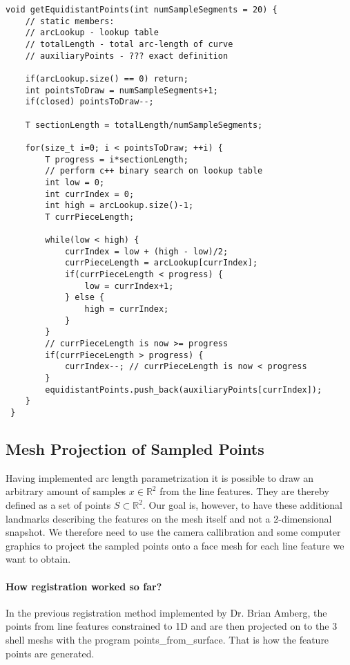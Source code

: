 \begin{lstlisting}[label=some-code, caption=Equidistant Sampling]
void getEquidistantPoints(int numSampleSegments = 20) {
    // static members: 
    // arcLookup - lookup table
    // totalLength - total arc-length of curve
    // auxiliaryPoints - ??? exact definition 

    if(arcLookup.size() == 0) return;
    int pointsToDraw = numSampleSegments+1; 
    if(closed) pointsToDraw--;

    T sectionLength = totalLength/numSampleSegments;

    for(size_t i=0; i < pointsToDraw; ++i) {
        T progress = i*sectionLength;
        // perform c++ binary search on lookup table
        int low = 0;
        int currIndex = 0;
        int high = arcLookup.size()-1;
        T currPieceLength; 

        while(low < high) {
            currIndex = low + (high - low)/2; 
            currPieceLength = arcLookup[currIndex];
            if(currPieceLength < progress) {
                low = currIndex+1;
            } else {
                high = currIndex;
            }
        }
        // currPieceLength is now >= progress
        if(currPieceLength > progress) {
            currIndex--; // currPieceLength is now < progress
        }
        equidistantPoints.push_back(auxiliaryPoints[currIndex]);   
    }
 }
\end{lstlisting}

\subsection{Mesh Projection of Sampled Points}
Having implemented arc length parametrization it is possible to draw an arbitrary amount of samples $x \in \mathbb{R}^2$ from the line features. They are thereby defined as a set of points $S \subset \mathbb{R}^2$. Our goal is, however, to have these additional landmarks describing the features on the mesh itself and not a 2-dimensional snapshot.
We therefore need to use the camera callibration and some computer graphics to project the sampled points onto a face mesh for each line feature we want to obtain.

\paragraph{How registration worked so far?}
In the previous registration method implemented by Dr. Brian Amberg, the
points from line features constrained to 1D
 and are then projected on to the 3 shell meshs with the program points_from_surface. That is how the feature points are generated.

